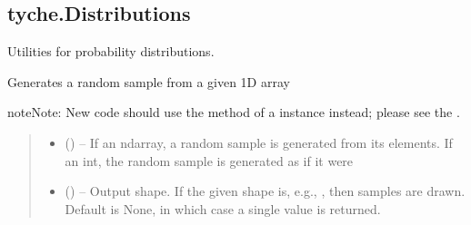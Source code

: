 \documentclass[letterpaper,10pt,english]{sphinxmanual}
\begin{document}
\subsection{tyche.Distributions}
\label{\detokenize{tyche:module-tyche.Distributions}}\label{\detokenize{tyche:tyche-distributions}}
\sphinxAtStartPar
Utilities for probability distributions.

\begin{fulllineitems}
\label{\detokenize{tyche:tyche.Distributions.choice}}
\pysigstartsignatures
{}
\pysigstopsignatures
\sphinxAtStartPar
Generates a random sample from a given 1\sphinxhyphen{}D array

\sphinxAtStartPar
{}

\begin{sphinxadmonition}{note}{Note:}
\sphinxAtStartPar
New code should use the 
method of a  instance instead;
please see the .
\end{sphinxadmonition}
\begin{quote}\begin{description}
\begin{itemize}
\item {} 
\sphinxAtStartPar
{} () – If an ndarray, a random sample is generated from its elements.
If an int, the random sample is generated as if it were 

\item {} 
\sphinxAtStartPar
{} (\sphinxstyleliteralemphasis{\sphinxupquote{, }}) – Output shape.  If the given shape is, e.g., , then
 samples are drawn.  Default is None, in which case a
single value is returned.


\end{itemize}
\end{description}
\end{quote}
\end{fulllineitems}
\end{document}
